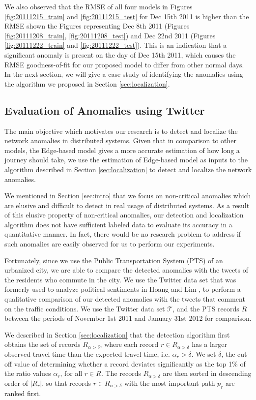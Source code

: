 \documentclass[conference]{IEEEtran.1.8}
\begin{document}
We also observed that the RMSE of all four models in Figures \ref{fig:20111215_train} and \ref{fig:20111215_test} for Dec 15th 2011 is higher than the RMSE shown the Figures representing Dec 8th 2011 (Figures \ref{fig:20111208_train}, \ref{fig:20111208_test}) and Dec 22nd 2011 (Figures \ref{fig:20111222_train} and \ref{fig:20111222_test}). This is an indication that a significant anomaly is present on the day of Dec 15th 2011, which causes the RMSE goodness-of-fit for our proposed model to differ from other normal days. In the next section, we will give a case study of identifying the anomalies using the algorithm we proposed in Section \ref{sec:localization}.

\subsection{Evaluation of Anomalies using Twitter}

The main objective which motivates our research is to detect and localize the network anomalies in distributed systems. Given that in comparison to other models, the Edge-based model gives a more accurate estimation of how long a journey should take, we use the estimation of Edge-based model as inputs to the algorithm described in Section \ref{sec:localization} to detect and localize the network anomalies.

We mentioned in Section \ref{sec:intro} that we focus on non-critical anomalies which are elusive and difficult to detect in real usage of distributed systems. As a result of this elusive property of non-critical anomalies, our detection and localization algorithm does not have sufficient labeled data to evaluate its accuracy in a quantitative manner. In fact, there would be no research problem to address if such anomalies are easily observed for us to perform our experiments.

Fortunately, since we use the Public Transportation System (PTS) of an urbanized city, we are able to compare the detected anomalies with the tweets of the residents who commute in the city. We use the Twitter data set that was formerly used to analyze political sentiments in Hoang and Lim \cite{Hoang2012}, to perform a qualitative comparison of our detected anomalies with the tweets that comment on the traffic conditions. We use the Twitter data set $\mathcal{T}$, and the PTS records $R$ between the periods of November 1st 2011 and January 31st 2012 for comparison.

We described in Section \ref{sec:localization} that the detection algorithm first obtains the set of records $R_{\alpha > \delta}$, where each record $r \in R_{\alpha > \delta}$ has a larger observed travel time than the expected travel time, i.e. $\alpha_r > \delta$. We set $\delta$, the cut-off value of determining whether a record deviates significantly as the top 1\% of the ratio values $\alpha_r$, for all $r \in R$. The records $R_{\alpha > \delta}$ are then sorted in descending order of $|R_r|$, so that records $r \in R_{\alpha > \delta}$ with the most important path $p_r$ are ranked first. 
\end{document}
